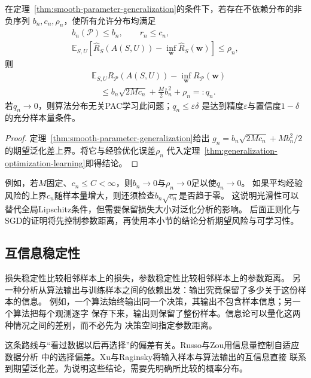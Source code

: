 \begin{theorem}[光滑损失下参数稳定性与可学习性]
\label{thm:smooth-parameter-learning}
在定理~\ref{thm:smooth-parameter-generalization}的条件下，若存在不依赖分布的非负序列
$b_n,c_n,\rho_n$，使所有允许分布均满足
\begin{gather*}
 b_n(\mathcal P)\leq b_n,\qquad r_n\leq c_n,\\
 \mathbb E_{S,U}[\hat R_S(A(S,U))-\inf_{\bm w}\hat R_S(\bm w)]\leq\rho_n,
\end{gather*}
则
\begin{align*}
 &\mathbb E_{S,U}R_{\mathcal P}(A(S,U))-\inf_{\bm w}R_{\mathcal P}(\bm w)\\
 &\quad\leq b_n\sqrt{2Mc_n}+\frac M2b_n^2+\rho_n=:q_n.
\end{align*}
若$q_n\to0$，则算法分布无关PAC学习此问题；$q_n\leq\varepsilon\delta$
是达到精度$\varepsilon$与置信度$1-\delta$的充分样本量条件。
\end{theorem}
\begin{proof}
定理~\ref{thm:smooth-parameter-generalization}给出
$g_n=b_n\sqrt{2Mc_n}+Mb_n^2/2$的期望泛化差上界。将它与经验优化误差$\rho_n$
代入定理~\ref{thm:generalization-optimization-learning}即得结论。
\end{proof}

例如，若$M$固定、$c_n\leq C<\infty$，则$b_n\to0$与$\rho_n\to0$足以使$q_n\to0$。
如果平均经验风险的上界$c_n$随样本量增大，则还须检查$b_n\sqrt{c_n}$是否趋于零。
这说明光滑性可以替代全局Lipschitz条件，但需要保留损失大小对泛化分析的影响。
后面正则化与SGD的证明将先控制参数距离，再使用本小节的结论分析期望风险与可学习性。

\subsection{互信息稳定性}
\label{sec:information-stability}

损失稳定性比较相邻样本上的损失，参数稳定性比较相邻样本上的参数距离。
另一种分析从算法输出与训练样本之间的依赖出发：输出究竟保留了多少关于这份样本的信息。
例如，一个算法始终输出同一个决策，其输出不包含样本信息；另一个算法把每个观测逐字
保存下来，输出则保留了整份样本。信息论可以量化这两种情况之间的差别，而不必先为
决策空间指定参数距离。

这条路线与“看过数据以后再选择”的偏差有关。Russo与Zou用信息量控制自适应数据分析
中的选择偏差。Xu与Raginsky将输入样本与算法输出的互信息直接
联系到期望泛化差。为说明这些结论，需要先明确所比较的概率分布。

